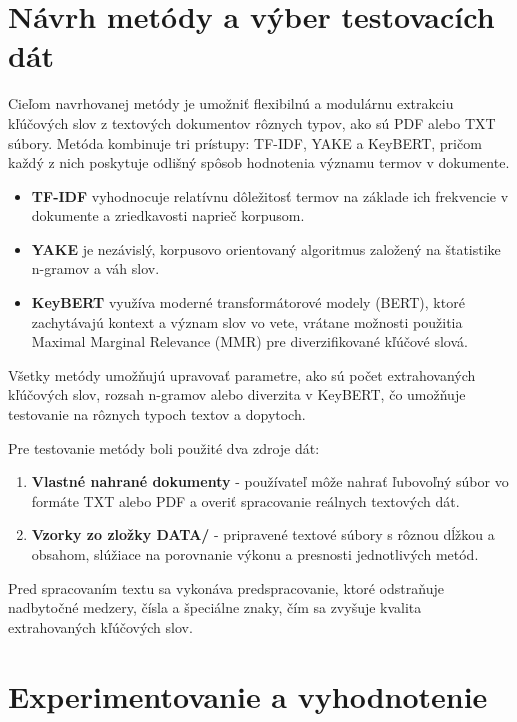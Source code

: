 \documentclass[a4paper,12pt]{article}
\begin{document}
\section{Návrh metódy a výber testovacích dát}

Cieľom navrhovanej metódy je umožniť flexibilnú a modulárnu extrakciu kľúčových slov z textových dokumentov rôznych typov, ako sú PDF alebo TXT súbory. Metóda kombinuje tri prístupy: TF-IDF, YAKE a KeyBERT, pričom každý z nich poskytuje odlišný spôsob hodnotenia významu termov v dokumente.  

\begin{itemize}
    \item \textbf{TF-IDF} vyhodnocuje relatívnu dôležitosť termov na základe ich frekvencie v dokumente a zriedkavosti naprieč korpusom.
    \item \textbf{YAKE} je nezávislý, korpusovo orientovaný algoritmus založený na štatistike n-gramov a váh slov.
    \item \textbf{KeyBERT} využíva moderné transformátorové modely (BERT), ktoré zachytávajú kontext a význam slov vo vete, vrátane možnosti použitia Maximal Marginal Relevance (MMR) pre diverzifikované kľúčové slová.
\end{itemize}

Všetky metódy umožňujú upravovať parametre, ako sú počet extrahovaných kľúčových slov, rozsah n-gramov alebo diverzita v KeyBERT, čo umožňuje testovanie na rôznych typoch textov a dopytoch.

Pre testovanie metódy boli použité dva zdroje dát:  

\begin{enumerate}
    \item \textbf{Vlastné nahrané dokumenty} - používateľ môže nahrať ľubovoľný súbor vo formáte TXT alebo PDF a overiť spracovanie reálnych textových dát.
    \item \textbf{Vzorky zo zložky DATA/} - pripravené textové súbory s rôznou dĺžkou a obsahom, slúžiace na porovnanie výkonu a presnosti jednotlivých metód.
\end{enumerate}

Pred spracovaním textu sa vykonáva predspracovanie, ktoré odstraňuje nadbytočné medzery, čísla a špeciálne znaky, čím sa zvyšuje kvalita extrahovaných kľúčových slov.

\section{Experimentovanie a vyhodnotenie}
\end{document}
